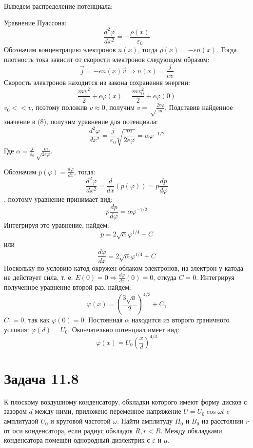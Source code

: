 \documentclass[11pt]{article}
\begin{document}
Выведем распределение потенциала:

Уравнение Пуассона:
\begin{equation}
\frac{d^2\varphi}{dx^2} = -\frac{\rho(x)}{\varepsilon_0}
\end{equation}
Обозначим концентрацию электронов \(n(x)\), тогда \(\rho(x) = -en(x)\). Тогда плотность тока зависит от скорости
электронов следующим образом:
$$\vec j = -en(x)\vec v \Rightarrow n(x) = \frac{j}{ev}$$
Скорость электронов находится из закона сохранения энергии:
$$\frac{mv^2}2 + e\varphi(x) = \frac{mv_0^2}2 + e\varphi(0)$$
\(v_0 << v\), поэтому положив \(v \approx 0\), получим \(v = \sqrt\frac{2e\varphi}m\). Подставив найденное значение в (8),
получим уравнение для потенциала:
$$\frac{d^2\varphi}{dx^2} = \frac{j}{\varepsilon_0}\sqrt{\frac{m}{2e\varphi}} = \alpha\varphi^{-1/2}$$
Где \(\alpha = \frac{j}{\varepsilon_0}\sqrt\frac{m}{2e\varphi}\).

Обозначим \(p(\varphi) = \frac{d\varphi}{dx}\), тогда:
$$\frac{d^2\varphi}{dx^2} = \frac{d}{dx}(p(\varphi)) = p\frac{dp}{d\varphi}$$, поэтому уравнение принимает вид:
$$p\frac{dp}{d\varphi} = \alpha\varphi^{-1/2}$$
Интегрируя это уравнение, найдём:
$$p = 2\sqrt\alpha\varphi^{1/4} + C$$
или
$$\frac{d\varphi}{dx} = 2\sqrt\alpha\varphi^{1/4} + C$$
Поскольку по условию катод окружен облаком электронов, на электрон у катода не действует сила, т. е. \(E(0) = 0
\Rightarrow \frac{d\varphi}{dx}(0) = 0\), откуда \(C = 0\).
Интегрируя полученное уравнение второй раз, найдём:
$$\varphi(x) = \left(\frac{3\sqrt a}2\right)^{4/3} + C_1$$
\(C_1 = 0\), так как \(\varphi(0) = 0\). Постоянная \(\alpha\) находится из второго граничного условия: \(\varphi(d) = U_0\).
Окончательно потенциал имеет вид:
$$\varphi(x) = U_0\left(\frac{x}d\right)^{4/3}$$
\section{Задача 11.8}
\label{sec:org0e96580}
К плоскому воздушному конденсатору, обкладки которого имеют форму дисков с зазором \(d\) между ними, приложено переменное
напряжение \(U = U_0\cos\omega t\) c амплитудой \(U_0\) и круговой частотой \(\omega\). Найти амплитуду \(H_0\) и \(B_0\) на
расстоянии \(r\) от оси конденсатора, если радиус обкладок \(R, r < R\). Между обкладками конденсатора помещён однородный
диэлектрик с \(\varepsilon\) и \(\mu\).
\end{document}
